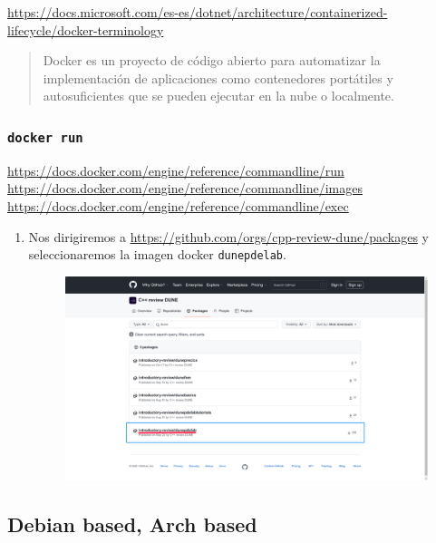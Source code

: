 \url{https://docs.microsoft.com/es-es/dotnet/architecture/containerized-lifecycle/docker-terminology}

\begin{quote}
	Docker es un proyecto de código abierto para automatizar la implementación de aplicaciones como contenedores portátiles y autosuficientes que se pueden ejecutar en la nube o localmente.
\end{quote}

\subsubsection{\texttt{docker run}}

\url{https://docs.docker.com/engine/reference/commandline/run}
\url{https://docs.docker.com/engine/reference/commandline/images}
\url{https://docs.docker.com/engine/reference/commandline/exec}


\begin{enumerate}
	\item Nos dirigiremos a \url{https://github.com/orgs/cpp-review-dune/packages} y seleccionaremos la imagen docker \texttt{dunepdelab}.
	      \begin{figure}[ht!]
		      \centering
		      \includegraphics[width=.6\paperwidth]{images/imagedunepdelab}
	      \end{figure}
\end{enumerate}

\subsection{Debian based, Arch based}

